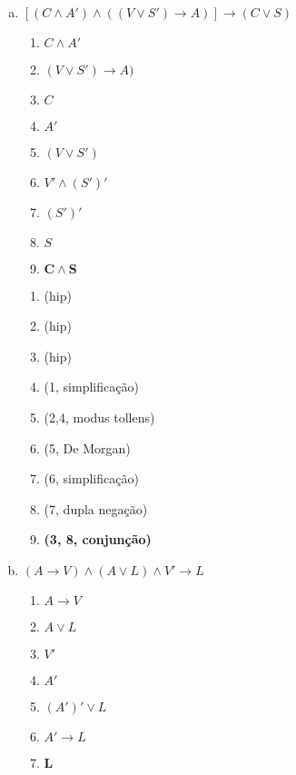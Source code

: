 \begin{Gabarito}{12}
~
    \begin{enumerate}[a)]
      \item $[(C \land A') \land ((V \lor S') \rightarrow A)] \rightarrow (C \lor S)$ \\
      \begin{multicols}{2}

        \begin{enumerate}[1.]
          \item $C \land A'$
          \item $(V \lor S') \rightarrow A)$
          \item $C$
          \item $A'$
          \item $(V \lor S')$
          \item $V' \land (S')'$
          \item $(S')'$
          \item $S$
          \item $\boldsymbol{C \land S}$
        \end{enumerate}

        \columnbreak

        \begin{enumerate}[\ding{32}]
          \item (hip)
          \item (hip)
          \item (hip)
          \item (1, simplificação)
          \item (2,4, modus tollens)
          \item (5, De Morgan)
          \item (6, simplificação)
          \item (7, dupla negação)
          \item \textbf{(3, 8, conjunção)}
        \end{enumerate}

      \end{multicols}

      \item $(A\rightarrow V) \land (A \lor L) \land V' \rightarrow L $
      \begin{multicols}{2}

        \begin{enumerate}[1.]
          \item $A\rightarrow V$
          \item $A \lor L$
          \item $V'$
          \item $A'$
          \item $(A')' \lor L$
          \item $A' \rightarrow L$
          \item $\boldsymbol{L}$
        \end{enumerate}


\end{multicols}
\end{enumerate}
\end{Gabarito}
